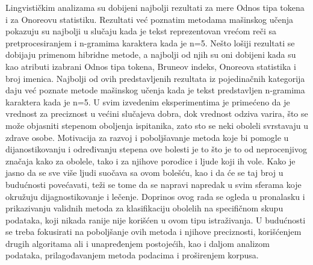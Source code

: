 \documentclass[12pt,oneside]{memoir}
\begin{document}
Lingvističkim analizama su dobijeni najbolji rezultati za mere Odnos tipa tokena i za Onoreovu statistiku.  Rezultati već poznatim metodama mašinskog učenja pokazuju su najbolji u slučaju kada je tekst reprezentovan vrećom reči sa pretprocesiranjem i n-gramima karaktera kada je n=5. Nešto lošiji rezultati se dobijaju primenom hibridne metode, a najbolji od njih su oni dobijeni kada su kao atributi izabrani Odnos tipa tokena, Bruneov indeks, Onoreova statistika i broj imenica.  Najbolji od ovih predstavljenih rezultata iz pojedinačnih kategorija daju već poznate metode mašinskog učenja kada je tekst predstavljen n-gramima karaktera kada je n=5.  U svim izvedenim eksperimentima je primećeno da je vrednost za preciznost u većini slučajeva dobra, dok vrednost odziva varira, što se može objasniti stepenom oboljenja ispitanika, zato sto se neki oboleli svrstavaju u zdrave osobe. 
Motivacija za razvoj i poboljšavanje metoda koje bi pomogle u dijanostikovanju i određivanju stepena ove bolesti je to što je to od neprocenjivog značaja kako za obolele, tako i za njihove porodice i ljude koji ih vole.  Kako je jasno da se sve više ljudi suočava sa ovom bolešću, kao i da će se taj broj u budućnosti povećavati, teži se tome da se napravi napredak u svim sferama koje okružuju dijagnostikovanje i lečenje. 
Doprinos ovog rada se ogleda u pronalasku i prikazivanju validnih metoda za klasifikaciju obolelih na specifičnom skupu podataka, koji nikada ranije nije korišćen u ovom tipu istraživanja.  
U budućnosti se treba fokusirati na poboljšanje ovih metoda i njihove preciznosti, korišćenjem drugih algoritama ali i unapređenjem postojećih, kao i daljom analizom podataka, prilagođavanjem metoda podacima i proširenjem korpusa. 





% 





\backmatter
\end{document}
